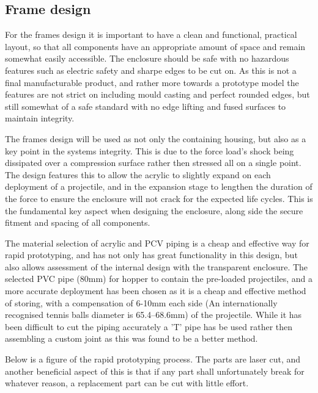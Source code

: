 \documentclass[a4paper, 10pt]{IEEEconf}
\begin{document}

\subsection{Frame design}

For the frames design it is important to have a clean and functional, practical layout, so that all components have an appropriate amount of space and remain somewhat easily accessible. The enclosure should be safe with no hazardous features such as electric safety and sharpe edges to be cut on. As this is not a final manufacturable product, and rather more towards a prototype model the features are not strict on including mould casting and perfect rounded edges, but still somewhat of a safe standard with no edge lifting and fused surfaces to maintain integrity. 

The frames design will be used as not only the containing housing, but also as a key point in the systems integrity. This is due to the force load's shock being dissipated over a compression surface rather then stressed all on a single point. The design features this to allow the acrylic to slightly expand on each deployment of a projectile, and in the expansion stage to lengthen the duration of the force to ensure the enclosure will not crack for the expected life cycles. This is the fundamental key aspect when designing the enclosure, along side the secure fitment and spacing of all components. 

The material selection of acrylic and PCV piping is a cheap and effective way for rapid prototyping, and has not only has great functionality in this design, but also allows assessment of the internal design with the transparent enclosure. The selected PVC pipe (80mm) for hopper to contain the pre-loaded projectiles, and a more accurate deployment has been chosen as it is a cheap and effective method of storing, with a compensation of 6-10mm each side (An internationally recognised tennis balls diameter is 65.4–68.6mm) \cite{ball} of the projectile. While it has been difficult to cut the piping accurately a 'T' pipe has be used rather then assembling a custom joint as this was found to be a better method.

Below is a figure of the rapid prototyping process. The parts are laser cut, and another beneficial aspect of this is that if any part shall unfortunately break for whatever reason, a replacement part can be cut with little effort.
\end{document}
